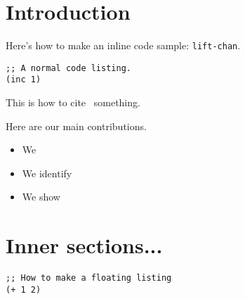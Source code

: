 \documentclass[preprint]{sigplanconf}
\begin{document}

\begin{abstract}
\end{abstract}





\section*{Introduction}


Here's how to make an inline code sample: \lstinline|lift-chan|.

\begin{lstlisting}
;; A normal code listing.
(inc 1)
\end{lstlisting}

This is how to cite~\cite{Tob10} something.


Here are our main contributions.

\begin{itemize}
  \item We 
  \item We identify
  \item We show
\end{itemize}

\section*{Inner sections...}

\begin{lstlisting}[float]
;; How to make a floating listing
(+ 1 2)
\end{lstlisting}

\printbibliography[title=References]
\end{document}
